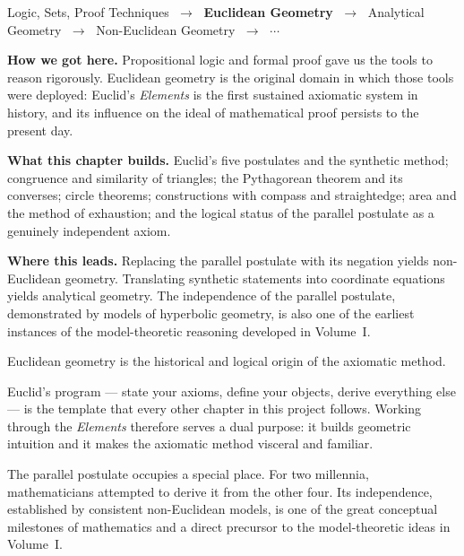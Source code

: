 \begin{tcolorbox}[
  colback=gray!6,
  colframe=gray!40,
  arc=2pt,
  left=8pt, right=8pt, top=6pt, bottom=6pt,
  title={\small\textbf{Where You Are in the Journey}},
  fonttitle=\small\bfseries
]
\begin{center}
\small
Logic, Sets, Proof Techniques
$\;\to\;$ \textbf{Euclidean Geometry}
$\;\to\;$ Analytical Geometry
$\;\to\;$ Non-Euclidean Geometry
$\;\to\;$ $\cdots$
\end{center}

\medskip
\noindent\textbf{How we got here.}
Propositional logic and formal proof gave us the tools to reason
rigorously.
Euclidean geometry is the original domain in which those tools
were deployed: Euclid's \textit{Elements} is the first
sustained axiomatic system in history, and its influence on the
ideal of mathematical proof persists to the present day.

\medskip
\noindent\textbf{What this chapter builds.}
Euclid's five postulates and the synthetic method; congruence
and similarity of triangles; the Pythagorean theorem and its
converses; circle theorems; constructions with compass and
straightedge; area and the method of exhaustion; and the
logical status of the parallel postulate as a genuinely
independent axiom.

\medskip
\noindent\textbf{Where this leads.}
Replacing the parallel postulate with its negation yields
non-Euclidean geometry.
Translating synthetic statements into coordinate equations
yields analytical geometry.
The independence of the parallel postulate, demonstrated
by models of hyperbolic geometry, is also one of the
earliest instances of the model-theoretic reasoning developed
in Volume~I.
\end{tcolorbox}
\vspace{1em}

\begin{tcolorbox}[
  colback=gray!6,
  colframe=gray!40,
  arc=2pt,
  left=8pt, right=8pt, top=6pt, bottom=6pt,
  title={\small\textbf{Structural Role: Classical Geometry — The Axiomatic Template}},
  fonttitle=\small\bfseries
]
Euclidean geometry is the historical and logical origin of the
axiomatic method.

Euclid's program --- state your axioms, define your objects,
derive everything else --- is the template that every other
chapter in this project follows.
Working through the \textit{Elements} therefore serves a dual
purpose: it builds geometric intuition and it makes the
axiomatic method visceral and familiar.

The parallel postulate occupies a special place.
For two millennia, mathematicians attempted to derive it from
the other four.
Its independence, established by consistent non-Euclidean
models, is one of the great conceptual milestones of
mathematics and a direct precursor to the model-theoretic
ideas in Volume~I.
\end{tcolorbox}
\vspace{1em}

